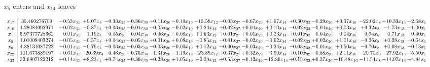 \documentclass[9pt]{article}
\begin{document}
 $ x_{5} $ enters and $ x_{14} $ leaves 

 \[\begin{array}{c| c c@{\hskip 2pt} c@{\hskip 2pt} c@{\hskip 2pt} c@{\hskip 2pt} c@{\hskip 2pt} c@{\hskip 2pt} c@{\hskip 2pt} c@{\hskip 2pt} c@{\hskip 2pt} c@{\hskip 2pt} c@{\hskip 2pt} c@{\hskip 2pt} c@{\hskip 2pt} c@{\hskip 2pt} c@{\hskip 2pt} c@{\hskip 2pt} }
 x_{17}   &  35.460276709 & -0.53 x_{31} & +  9.07 x_{4} & -0.33 x_{25} & +  0.36 x_{30} & +  0.11 x_{20} & -0.10 x_{19} & -13.59 x_{12} & -0.03 x_{27} & -0.67 x_{29} & +  1.97 x_{14} & +  0.30 x_{32} & -0.29 x_{26} & +  3.37 x_{16} & -22.02 x_{8} & + 10.33 x_{13} & -2.68 x_{1}\\
 x_{10}   &  4.28084092971 & +  0.02 x_{31} & -0.87 x_{4} & +  0.03 x_{25} & +  0.01 x_{30} & -0.05 x_{20} & -0.02 x_{19} & +  0.24 x_{12} & +  0.02 x_{27} & +  0.04 x_{29} & +  0.10 x_{14} & -0.02 x_{32} & -0.04 x_{26} & +  0.03 x_{16} & +  0.32 x_{8} & -1.73 x_{13} & +  1.00 x_{1}\\
 x_{7}   &  5.97377728662 & -0.01 x_{31} & -1.19 x_{4} & -0.05 x_{25} & +  0.04 x_{30} & -0.06 x_{20} & -0.08 x_{19} & +  0.63 x_{12} & +  0.01 x_{27} & +  0.01 x_{29} & +  0.23 x_{14} & +  0.01 x_{32} & -0.04 x_{26} & -0.04 x_{16} & -0.94 x_{8} & -0.71 x_{13} & +  0.40 x_{1}\\
 x_{5}   &  1.01008403274 & -0.05 x_{31} & -0.37 x_{4} & +  0.04 x_{25} & +  0.05 x_{30} & +  0.01 x_{20} & +  0.08 x_{19} & -0.85 x_{12} & -0.01 x_{27} & -0.02 x_{29} & -0.92 x_{14} & -0.02 x_{32} & +  0.02 x_{26} & +  1.01 x_{16} & -0.26 x_{8} & +  0.28 x_{13} & +  0.64 x_{1}\\
 x_{6}   &  4.88131087723 & -0.01 x_{31} & -0.79 x_{4} & -0.03 x_{25} & +  0.03 x_{30} & -0.03 x_{20} & -0.00 x_{19} & +  0.12 x_{12} & -0.00 x_{27} & -0.03 x_{29} & -0.24 x_{14} & -0.03 x_{32} & -0.01 x_{26} & +  0.50 x_{16} & -0.70 x_{8} & +  0.08 x_{13} & -0.13 x_{1}\\
 x_{22}   &  101.673889197 & +  0.61 x_{31} & -20.39 x_{4} & -0.46 x_{25} & +  0.75 x_{30} & -1.31 x_{20} & -1.19 x_{19} & + 23.89 x_{12} & +  0.37 x_{27} & +  0.32 x_{29} & -3.90 x_{14} & +  0.10 x_{32} & -0.88 x_{26} & +  2.11 x_{16} & -20.70 x_{8} & -27.92 x_{13} & +  5.50 x_{1}\\
 x_{23}   &  32.9807122212 & +  0.14 x_{31} & +  8.23 x_{4} & +  0.74 x_{25} & -0.39 x_{30} & -0.28 x_{20} & +  1.05 x_{19} & -2.38 x_{12} & +  0.53 x_{27} & -0.12 x_{29} & -12.89 x_{14} & +  0.15 x_{32} & +  0.37 x_{26} & + 16.48 x_{16} & -11.54 x_{8} & -14.97 x_{13} & +  4.84 x_{1}\\

\end{array}\]
\end{document}

